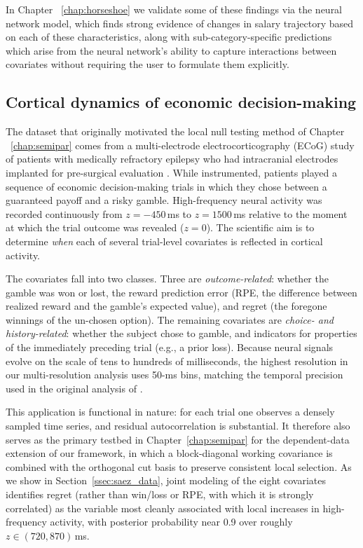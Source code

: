 In Chapter ~\ref{chap:horseshoe} we validate some of these findings via the neural network model, which finds strong evidence of changes in salary trajectory based on each of these characteristics, along with sub-category-specific predictions which arise from the neural network's ability to capture interactions between covariates without requiring the user to formulate them explicitly.

\subsection*{Cortical dynamics of economic decision-making}

The dataset that originally motivated the local null testing method of Chapter ~\ref{chap:semipar} comes from a multi-electrode electrocorticography (ECoG) study of patients with medically refractory epilepsy who had intracranial electrodes implanted for pre-surgical evaluation \citep{saez:2018}. While instrumented, patients played a sequence of economic decision-making trials in which they chose between a guaranteed payoff and a risky gamble. High-frequency neural activity was recorded continuously from $z=-450$\,ms to $z=1500$\,ms relative to the moment at which the trial outcome was revealed ($z=0$). The scientific aim is to determine \emph{when} each of several trial-level covariates is reflected in cortical activity.

The covariates fall into two classes. Three are \emph{outcome-related}: whether the gamble was won or lost, the reward prediction error (RPE, the difference between realized reward and the gamble's expected value), and regret (the foregone winnings of the un-chosen option). The remaining covariates are \emph{choice- and history-related}: whether the subject chose to gamble, and indicators for properties of the immediately preceding trial (e.g., a prior loss). Because neural signals evolve on the scale of tens to hundreds of milliseconds, the highest resolution in our multi-resolution analysis uses 50-ms bins, matching the temporal precision used in the original analysis of \citet{saez:2018}.

This application is functional in nature: for each trial one observes a densely sampled time series, and residual autocorrelation is substantial. It therefore also serves as the primary testbed in Chapter~\ref{chap:semipar} for the dependent-data extension of our framework, in which a block-diagonal working covariance is combined with the orthogonal cut basis to preserve consistent local selection. As we show in Section~\ref{ssec:saez_data}, joint modeling of the eight covariates identifies regret (rather than win/loss or RPE, with which it is strongly correlated) as the variable most cleanly associated with local increases in high-frequency activity, with posterior probability near 0.9 over roughly $z \in (720, 870)$\,ms.
